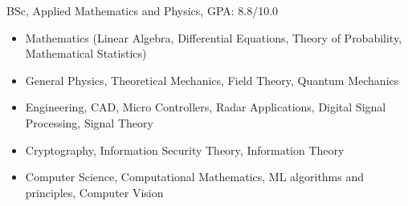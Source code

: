 \documentclass[10pt,a4paper]{cv}
\begin{document}
BSc, Applied Mathematics and Physics,
GPA: 8.8/10.0

\begin{itemize}
\item Mathematics (Linear Algebra, Differential Equations, Theory of Probability, Mathematical Statistics)
\item General Physics, Theoretical Mechanics, Field Theory, Quantum Mechanics
\item Engineering, CAD, Micro Controllers, Radar Applications, Digital Signal Processing, Signal Theory
\item Cryptography, Information Security Theory, Information Theory
\item Computer Science, Computational Mathematics, ML algorithms and principles, Computer Vision
\end{itemize}

\divider



 

\clearpage
\end{document}
